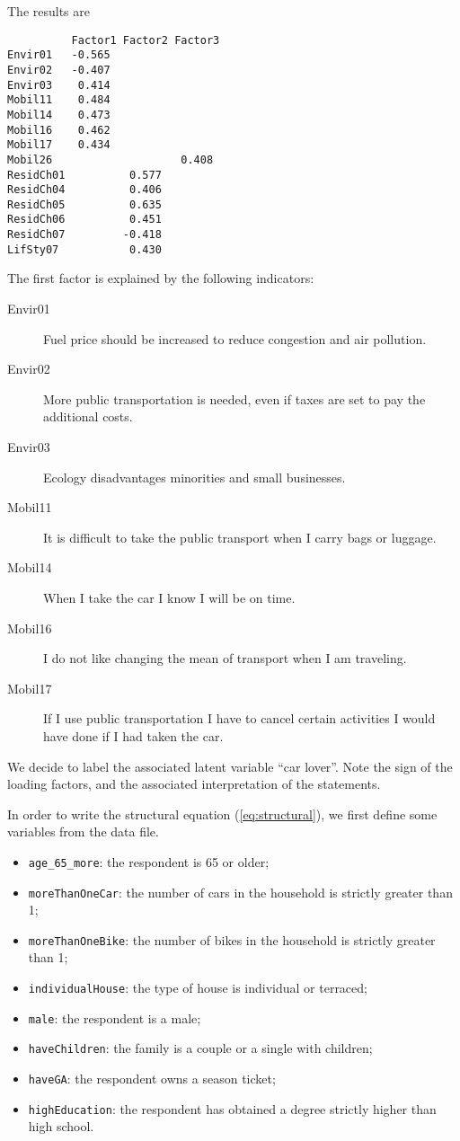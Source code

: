 \documentclass[12pt,a4paper]{article}
\newcommand{\req}[1]{(\ref{#1})}
\begin{document}
The results are
\begin{lstlisting}
          Factor1 Factor2 Factor3
Envir01   -0.565                 
Envir02   -0.407                 
Envir03    0.414                 
Mobil11    0.484                 
Mobil14    0.473                 
Mobil16    0.462                 
Mobil17    0.434                 
Mobil26                    0.408 
ResidCh01          0.577         
ResidCh04          0.406         
ResidCh05          0.635         
ResidCh06          0.451         
ResidCh07         -0.418         
LifSty07           0.430         
\end{lstlisting}

The first factor is explained by the following indicators: 
\begin{description}
\item[Envir01] Fuel price should be increased to reduce congestion and air pollution. 
\item[Envir02] More public transportation is needed, even if taxes are set to pay the additional costs.
\item[Envir03] Ecology disadvantages minorities and small businesses.
\item[Mobil11]  It is difficult to take the public transport when I carry bags or luggage.
\item[Mobil14]  When I take the car I know I will be on time.
\item[Mobil16] I do not like changing the mean of transport when I am
  traveling.
\item[Mobil17] If I use public transportation I have to cancel certain activities I would have done if I had taken the car.
\end{description}

We decide to label the associated latent variable ``car lover''. Note
the sign of the loading factors, and the associated interpretation of
the statements. 

In order to write the structural equation \req{eq:structural}, we
first define some variables from the data file. 

\begin{itemize}
\item \lstinline+age_65_more+: the respondent is 65 or older;
\item \lstinline+moreThanOneCar+: the number of cars in the household is
  strictly greater than 1;
\item \lstinline+moreThanOneBike+: the number of bikes in the household is
  strictly greater than 1;
\item \lstinline+individualHouse+: the type of house is individual or terraced;
\item \lstinline+male+: the respondent is a male;
\item \lstinline+haveChildren+: the family is a couple or a single with children;
\item \lstinline+haveGA+: the respondent owns a season ticket;
\item \lstinline+highEducation+: the respondent has obtained a degree
  strictly higher than high school.
\end{itemize}
\end{document}
